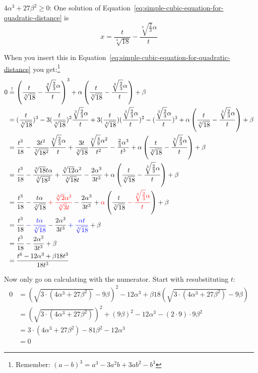 $4 \alpha^3 + 27 \beta^2 \geq 0$:
One solution of Equation~\ref{eq:simple-cubic-equation-for-quadratic-distance}
is
\[x = \frac{t}{\sqrt[3]{18}} - \frac{\sqrt[3]{\frac{2}{3}} \alpha }{t}\]

When you insert this in Equation~\ref{eq:simple-cubic-equation-for-quadratic-distance}
you get:\footnote{Remember: $(a-b)^3 = a^3-3 a^2 b+3 a b^2-b^3$}
\allowdisplaybreaks
\begin{align}
    0 &\stackrel{!}{=} \left (\frac{t}{\sqrt[3]{18}} - \frac{\sqrt[3]{\frac{2}{3}} \alpha }{t} \right )^3 + \alpha \left (\frac{t}{\sqrt[3]{18}} - \frac{\sqrt[3]{\frac{2}{3}} \alpha }{t} \right ) + \beta\\
&= (\frac{t}{\sqrt[3]{18}})^3 
    - 3 (\frac{t}{\sqrt[3]{18}})^2 \frac{\sqrt[3]{\frac{2}{3}} \alpha }{t} 
    + 3 (\frac{t}{\sqrt[3]{18}})(\frac{\sqrt[3]{\frac{2}{3}} \alpha }{t})^2 
    - (\frac{\sqrt[3]{\frac{2}{3}} \alpha }{t})^3 
    + \alpha \left (\frac{t}{\sqrt[3]{18}} - \frac{\sqrt[3]{\frac{2}{3}} \alpha }{t} \right ) + \beta\\
&= \frac{t^3}{18}             
    - \frac{3t^2}{\sqrt[3]{18^2}} \frac{\sqrt[3]{\frac{2}{3}} \alpha }{t}
    + \frac{3t}{\sqrt[3]{18}} \frac{\sqrt[3]{\frac{4}{9}} \alpha^2 }{t^2} 
    - \frac{\frac{2}{3} \alpha^3 }{t^3} 
    + \alpha \left (\frac{t}{\sqrt[3]{18}} - \frac{\sqrt[3]{\frac{2}{3}} \alpha }{t} \right ) + \beta\\
&= \frac{t^3}{18}
    - \frac{\sqrt[3]{18} t \alpha}{\sqrt[3]{18^2}}
    + \frac{\sqrt[3]{12} \alpha^2}{\sqrt[3]{18} t}  
    - \frac{2 \alpha^3 }{3t^3} 
    + \alpha \left (\frac{t}{\sqrt[3]{18}} - \frac{\sqrt[3]{\frac{2}{3}} \alpha }{t} \right ) + \beta\\
&= \frac{t^3}{18} 
    - \frac{t \alpha}{\sqrt[3]{18}} 
    \color{red}+ \frac{\sqrt[3]{2} \alpha^2}{\sqrt[3]{3} t} \color{black}
    - \frac{2 \alpha^3 }{3 t^3} 
    + \color{red}\alpha \color{black} \left (\frac{t}{\sqrt[3]{18}}  \color{red}- \frac{\sqrt[3]{\frac{2}{3}} \alpha }{t} \color{black}\right ) 
    + \beta\\
&= \frac{t^3}{18} \color{blue}- \frac{t \alpha}{\sqrt[3]{18}} \color{black} 
    - \frac{2 \alpha^3 }{3 t^3} 
    \color{blue}+ \frac{\alpha t}{\sqrt[3]{18}} \color{black} 
    + \beta\\
&= \frac{t^3}{18} - \frac{2 \alpha^3 }{3 t^3} + \beta\\
&= \frac{t^6 - 12 \alpha^3 + \beta 18 t^3}{18t^3}
\end{align}

Now only go on calculating with the numerator. Start with resubstituting
$t$:
\begin{align}
0 &= (\sqrt{3 \cdot (4 \alpha^3 + 27 \beta^2)} -9\beta)^2 - 12 \alpha^3 + \beta 18 (\sqrt{3 \cdot (4 \alpha^3 + 27 \beta^2)} -9\beta)\\
&= (\sqrt{3 \cdot (4 \alpha^3 + 27 \beta^2)})^2 +(9\beta)^2 - 12 \alpha^3 -(2 \cdot 9)\cdot 9\beta^2\\
&= 3 \cdot (4 \alpha^3 + 27 \beta^2) -81 \beta^2 - 12 \alpha^3\\
&= 0
\end{align}
